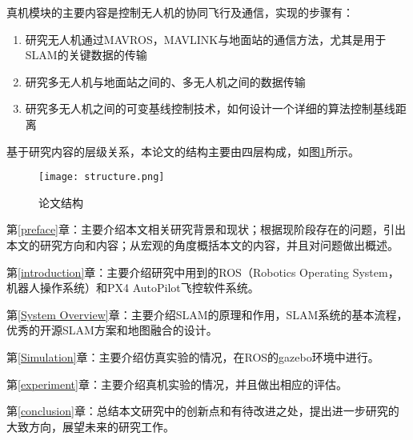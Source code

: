 真机模块的主要内容是控制无人机的协同飞行及通信，实现的步骤有：

\begin{enumerate}
	\item 研究无人机通过MAVROS，MAVLINK与地面站的通信方法，尤其是用于SLAM的关键数据的传输
	\item 研究多无人机与地面站之间的、多无人机之间的数据传输
	\item 研究多无人机之间的可变基线控制技术，如何设计一个详细的算法控制基线距离
\end{enumerate}

基于研究内容的层级关系，本论文的结构主要由四层构成，如图\ref{fig1}所示。
\vspace{10pt}
\begin{figure}[!ht]
\centering
\texttt{[image: structure.png]}
\caption{论文结构 }
\label{fig1}
\end{figure}


第\ref{preface}章：主要介绍本文相关研究背景和现状；根据现阶段存在的问题，引出本文的研究方向和内容；从宏观的角度概括本文的内容，并且对问题做出概述。

第\ref{introduction}章：主要介绍研究中用到的ROS（Robotics Operating System，机器人操作系统）和PX4 AutoPilot飞控软件系统。

第\ref{System Overview}章：主要介绍SLAM的原理和作用，SLAM系统的基本流程，优秀的开源SLAM方案和地图融合的设计。

第\ref{Simulation}章：主要介绍仿真实验的情况，在ROS的gazebo环境中进行。

第\ref{experiment}章：主要介绍真机实验的情况，并且做出相应的评估。

第\ref{conclusion}章：总结本文研究中的创新点和有待改进之处，提出进一步研究的大致方向，展望未来的研究工作。

